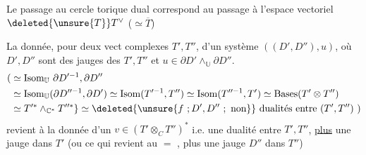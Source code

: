 Le passage au cercle torique  dual correspond au passage à l'espace vectoriel    $\deleted{\unsure{T}}T^\vee$ ($\simeq\overline T$)

La donnée, pour deux   vect complexes $T',T''$, d'un système $((D',D''),u)$, où $D',D''$ sont des jauges des $T',T''$ et $u\in\partial D'\mathbin{\wedge}_{\mathbb U}\partial D''$.
\[
\begin{aligned}
(&\simeq\operatorname{Isom}_{\mathbb U}\,\partial D'^{-1},\partial D''\\
 &\simeq\operatorname{Isom}_{\mathbb U}(\partial D''^{-1},\partial D')
 \simeq\operatorname{Isom}(T'^{-1},T'')\simeq\operatorname{Isom}(T''^{-1},T')\simeq\mathrm{Bases}(T'\otimes T'')\\
 &\simeq T'^{*}\mathbin{\wedge}_{\mathbb C^{*}}T''^{*}\}\simeq
 \deleted{\unsure{f\ ;D',D''\ ;\ \text{non}}}\ \text{dualités entre }(T',T'')\ )
\end{aligned}
\]
revient à la donnée d'un $v\in(T'\otimes_{C}T'')^{*}$ i.e. une dualité entre $T',T''$, \uline{plus} une jauge  dans $T'$ (ou ce qui revient au $=$  , plus une jauge $D''$ dans $T''$)
